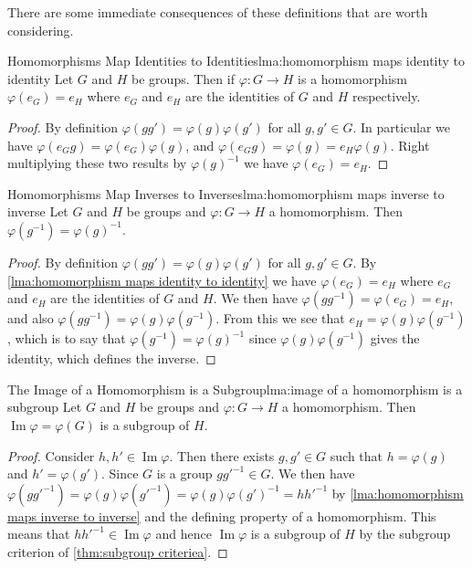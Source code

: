 \documentclass[fleqn]{NotesClass}
\DeclareMathOperator{\image}{Im}
\begin{document}
    There are some immediate consequences of these definitions that are worth considering.
    \begin{lma}{Homomorphisms Map Identities to Identities}{lma:homomorphism maps identity to identity}
        Let \(G\) and \(H\) be groups.
        Then if \(\varphi\colon G \to H\) is a homomorphism \(\varphi(e_{G}) = e_{H}\) where \(e_G\) and \(e_H\) are the identities of \(G\) and \(H\) respectively.
        
        \begin{proof}
            By definition \(\varphi(gg') = \varphi(g)\varphi(g')\) for all \(g, g' \in G\).
            In particular we have \(\varphi(e_Gg) = \varphi(e_G)\varphi(g)\), and \(\varphi(e_Gg) = \varphi(g) = e_H\varphi(g)\).
            Right multiplying these two results by \(\varphi(g)^{-1}\) we have \(\varphi(e_G) = e_H\).
        \end{proof}
    \end{lma}
    
    \begin{lma}{Homomorphisms Map Inverses to Inverses}{lma:homomorphism maps inverse to inverse}
        Let \(G\) and \(H\) be groups and \(\varphi \colon G \to H\) a homomorphism.
        Then \(\varphi(g^{-1}) = \varphi(g)^{-1}\).
        
        \begin{proof}
            By definition \(\varphi(gg') = \varphi(g)\varphi(g')\) for all \(g, g' \in G\).
            By \cref{lma:homomorphism maps identity to identity} we have \(\varphi(e_G) = e_H\) where \(e_G\) and \(e_H\) are the identities of \(G\) and \(H\).
            We then have \(\varphi(gg^{-1}) = \varphi(e_G) = e_H\), and also \(\varphi(gg^{-1}) = \varphi(g)\varphi(g^{-1})\).
            From this we see that \(e_H = \varphi(g)\varphi(g^{-1})\), which is to say that \(\varphi(g^{-1}) = \varphi(g)^{-1}\) since \(\varphi(g)\varphi(g^{-1})\) gives the identity, which defines the inverse.
        \end{proof}
    \end{lma}
    
    \begin{lma}{The Image of a Homomorphism is a Subgroup}{lma:image of a homomorphism is a subgroup}
        Let \(G\) and \(H\) be groups and \(\varphi\colon G \to H\) a homomorphism.
        Then \(\image\varphi = \varphi(G)\) is a subgroup of \(H\).
        
        \begin{proof}
            Consider \(h, h' \in \image \varphi\).
            Then there exists \(g, g' \in G\) such that \(h = \varphi(g)\) and \(h' = \varphi(g')\).
            Since \(G\) is a group \(gg'^{-1} \in G\).
            We then have \(\varphi(gg'^{-1}) = \varphi(g)\varphi(g'^{-1}) = \varphi(g)\varphi(g')^{-1} = hh'^{-1}\) by \cref{lma:homomorphism maps inverse to inverse} and the defining property of a homomorphism.
            This means that \(hh'^{-1} \in \image \varphi\) and hence \(\image\varphi\) is a subgroup of \(H\) by the subgroup criterion of \cref{thm:subgroup criteriea}.
        \end{proof}
    \end{lma}
    
\end{document}

